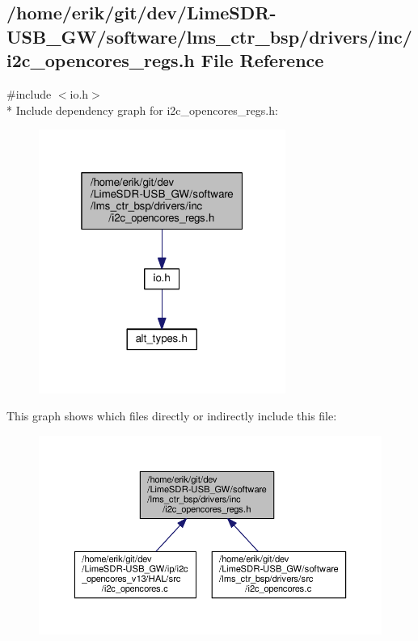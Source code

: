 \subsection{/home/erik/git/dev/\+Lime\+S\+D\+R-\/\+U\+S\+B\+\_\+\+G\+W/software/lms\+\_\+ctr\+\_\+bsp/drivers/inc/i2c\+\_\+opencores\+\_\+regs.h File Reference}
\label{software_2lms__ctr__bsp_2drivers_2inc_2i2c__opencores__regs_8h}
{\ttfamily \#include $<$io.\+h$>$}\\*
Include dependency graph for i2c\+\_\+opencores\+\_\+regs.\+h\+:
\nopagebreak
\begin{figure}[H]
\begin{center}
\leavevmode
\includegraphics[width=229pt]{d8/d24/software_2lms__ctr__bsp_2drivers_2inc_2i2c__opencores__regs_8h__incl}
\end{center}
\end{figure}
This graph shows which files directly or indirectly include this file\+:
\nopagebreak
\begin{figure}[H]
\begin{center}
\leavevmode
\includegraphics[width=350pt]{d6/d4e/software_2lms__ctr__bsp_2drivers_2inc_2i2c__opencores__regs_8h__dep__incl}
\end{center}
\end{figure}
